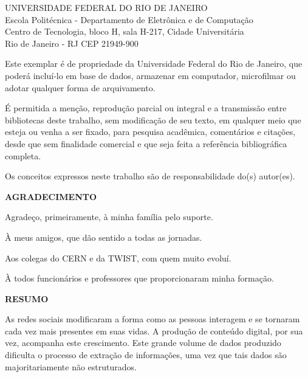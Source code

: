 \pagebreak

\vspace{0.5cm}

UNIVERSIDADE FEDERAL DO RIO DE JANEIRO \\
Escola Politécnica - Departamento de Eletrônica e de Computação \\
Centro de Tecnologia, bloco H, sala H-217, Cidade Universitária \\
Rio de Janeiro - RJ      CEP 21949-900\\
\vspace{0.5cm}

Este exemplar é de propriedade da Universidade Federal do Rio de Janeiro, que poderá incluí-lo em base de dados, armazenar em computador, microfilmar ou adotar qualquer forma de arquivamento.

É permitida a menção, reprodução parcial ou integral e a transmissão entre bibliotecas deste trabalho, sem modificação de seu texto, em qualquer meio que esteja ou venha a ser fixado, para pesquisa acadêmica, comentários e citações, desde que sem finalidade comercial e que seja feita a referência bibliográfica completa.

Os conceitos expressos neste trabalho são de responsabilidade do(s) autor(es).

\pagebreak

\begin{center}
\textbf{AGRADECIMENTO}
\end{center}
\vspace{0.5cm}

Agradeço, primeiramente, à minha família pelo suporte.

À meus amigos, que dão sentido a todas as jornadas.

Aos colegas do CERN e da TWIST, com quem muito evoluí.

À todos funcionários e professores que proporcionaram minha formação.

\pagebreak

\begin{center}
\textbf{RESUMO}
\end{center}
\vspace{0.5cm}

As redes sociais modificaram a forma como as pessoas interagem e se tornaram cada vez mais presentes em suas vidas.
A produção de conteúdo digital, por sua vez, acompanha este crescimento.
Este grande volume de dados produzido dificulta o processo de extração de informações, uma vez que tais dados são
majoritariamente não estruturados.

